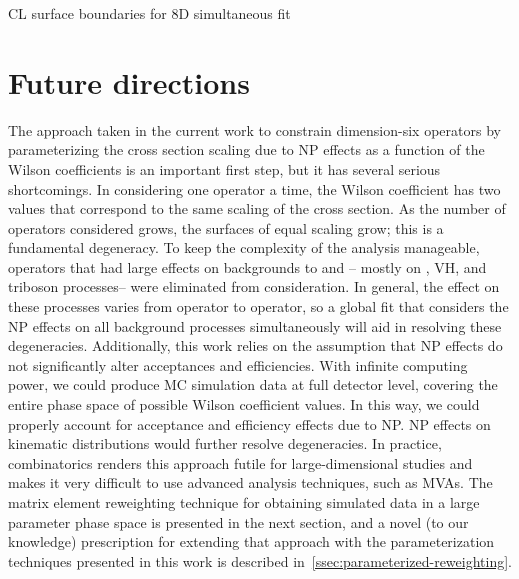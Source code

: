 \begin{table}
  \centering
  \caption[CL surface boundaries for 8D simultaneous fit]{CL surface boundaries for 8D simultaneous fit}
  \label{tab:8d-CLs}
  
\end{table}

\section{Future directions}
\label{sec:future}
The approach taken in the current work to constrain dimension-six operators by parameterizing the cross section scaling due to NP effects as a function of the Wilson coefficients is an important first step, but it has several serious shortcomings. In considering one operator a time, the Wilson coefficient has two values that correspond to the same scaling of the cross section. As the number of operators considered grows, the surfaces of equal scaling grow; this is a fundamental degeneracy. To keep the complexity of the analysis manageable, operators that had large effects on backgrounds to \ttX and \ttZ-- mostly on \ttX, VH, and triboson processes-- were eliminated from consideration. In general, the effect on these processes varies from operator to operator, so a global fit that considers the NP effects on all background processes simultaneously will aid in resolving these degeneracies. Additionally, this work relies on the assumption that NP effects do not significantly alter acceptances and efficiencies. With infinite computing power, we could produce MC simulation data at full detector level, covering the entire phase space of possible Wilson coefficient values. In this way, we could properly account for acceptance and efficiency effects due to NP. NP effects on kinematic distributions would further resolve degeneracies. In practice, combinatorics renders this approach futile for large-dimensional studies and makes it very difficult to use advanced analysis techniques, such as MVAs. The matrix element reweighting technique for obtaining simulated data in a large parameter phase space is presented in the next section, and a novel (to our knowledge) prescription for extending that approach with the parameterization techniques presented in this work is described in~\cref{ssec:parameterized-reweighting}.

